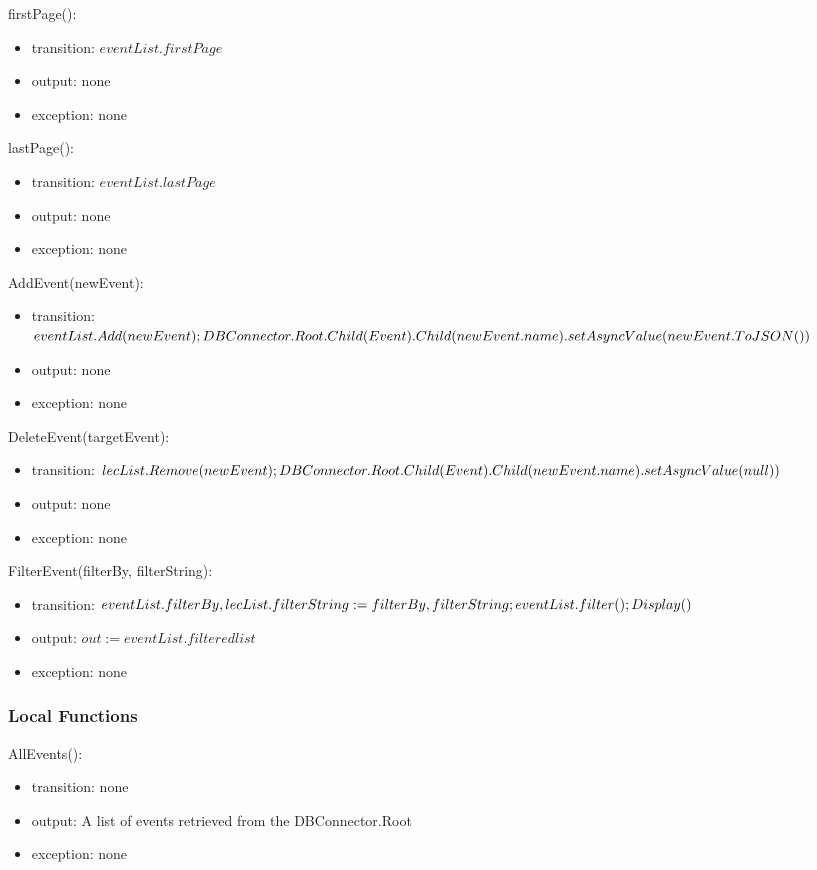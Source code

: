 \documentclass[12pt, titlepage]{article}
\begin{document}
\noindent firstPage():
\begin{itemize}
\item transition: $eventList.firstPage$
\item output: none
\item exception: none
\end{itemize}

\noindent lastPage():
\begin{itemize}
\item transition: $eventList.lastPage$
\item output: none
\item exception: none
\end{itemize}

\noindent AddEvent(newEvent):
\begin{itemize}
\item transition: $eventList.Add(newEvent);\\DBConnector.Root.Child(Event).Child(newEvent.name).setAsyncValue(newEvent.ToJSON())$
\item output: none
\item exception: none
\end{itemize}

\noindent DeleteEvent(targetEvent):
\begin{itemize}
\item transition: $lecList.Remove(newEvent);\\DBConnector.Root.Child(Event).Child(newEvent.name).setAsyncValue(null))$
\item output: none
\item exception: none
\end{itemize}

\noindent FilterEvent(filterBy, filterString):
\begin{itemize}
\item transition: $eventList.filterBy, lecList.filterString := filterBy, filterString;\\eventList.filter(); Display()$
\item output: $out := eventList.filteredlist$
\item exception: none
\end{itemize}
\subsubsection{Local Functions}

\noindent AllEvents():
\begin{itemize}
\item transition: none
\item output: A list of events retrieved from the DBConnector.Root
\item exception: none
\end{itemize}
\end{document}
